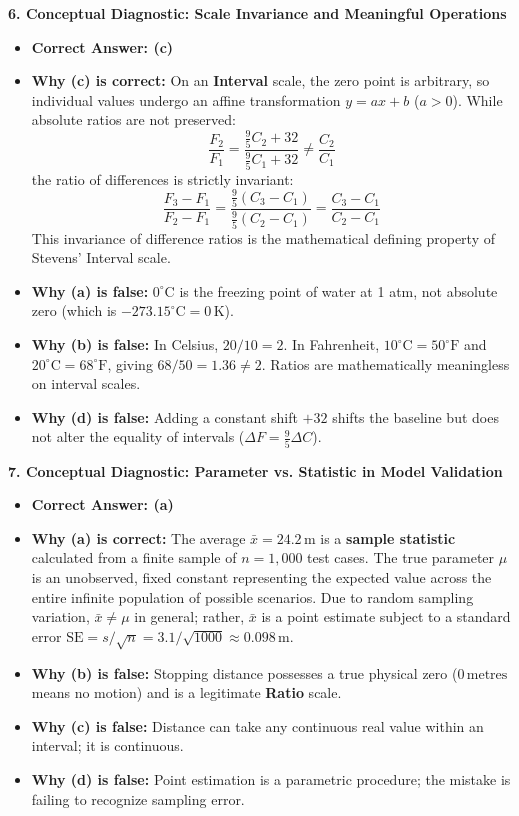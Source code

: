 \textbf{6. Conceptual Diagnostic: Scale Invariance and Meaningful Operations}
\begin{itemize}
    \item \textbf{Correct Answer: (c)}
    \item \textbf{Why (c) is correct:} On an \textbf{Interval} scale, the zero point is arbitrary, so individual values undergo an affine transformation $y = ax + b$ ($a > 0$). While absolute ratios are not preserved:
    $$\frac{F_2}{F_1} = \frac{\frac{9}{5}C_2 + 32}{\frac{9}{5}C_1 + 32} \neq \frac{C_2}{C_1}$$
    the ratio of differences is strictly invariant:
    $$\frac{F_3 - F_1}{F_2 - F_1} = \frac{\frac{9}{5}(C_3 - C_1)}{\frac{9}{5}(C_2 - C_1)} = \frac{C_3 - C_1}{C_2 - C_1}$$
    This invariance of difference ratios is the mathematical defining property of Stevens' Interval scale.
    \item \textbf{Why (a) is false:} $0^\circ\text{C}$ is the freezing point of water at 1 atm, not absolute zero (which is $-273.15^\circ\text{C} = 0\,\text{K}$).
    \item \textbf{Why (b) is false:} In Celsius, $20/10 = 2$. In Fahrenheit, $10^\circ\text{C} = 50^\circ\text{F}$ and $20^\circ\text{C} = 68^\circ\text{F}$, giving $68/50 = 1.36 \neq 2$. Ratios are mathematically meaningless on interval scales.
    \item \textbf{Why (d) is false:} Adding a constant shift $+32$ shifts the baseline but does not alter the equality of intervals ($\Delta F = \frac{9}{5}\Delta C$).
\end{itemize}

\textbf{7. Conceptual Diagnostic: Parameter vs. Statistic in Model Validation}
\begin{itemize}
    \item \textbf{Correct Answer: (a)}
    \item \textbf{Why (a) is correct:} The average $\bar{x} = 24.2\,\text{m}$ is a \textbf{sample statistic} calculated from a finite sample of $n = 1{,}000$ test cases. The true parameter $\mu$ is an unobserved, fixed constant representing the expected value across the entire infinite population of possible scenarios. Due to random sampling variation, $\bar{x} \neq \mu$ in general; rather, $\bar{x}$ is a point estimate subject to a standard error $\text{SE} = s/\sqrt{n} = 3.1/\sqrt{1000} \approx 0.098\,\text{m}$.
    \item \textbf{Why (b) is false:} Stopping distance possesses a true physical zero ($0\,\text{metres}$ means no motion) and is a legitimate \textbf{Ratio} scale.
    \item \textbf{Why (c) is false:} Distance can take any continuous real value within an interval; it is continuous.
    \item \textbf{Why (d) is false:} Point estimation is a parametric procedure; the mistake is failing to recognize sampling error.
\end{itemize}


